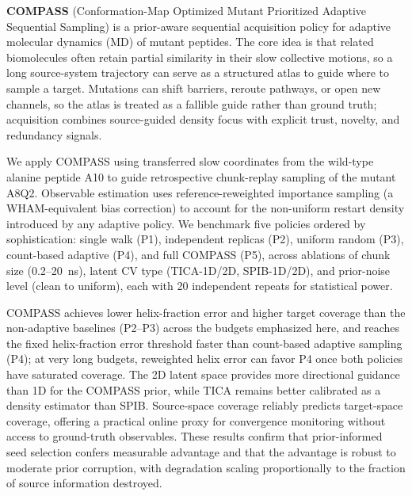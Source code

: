 \documentclass[12pt,a4paper,oneside]{report}
\begin{document}
\noindent
\textbf{COMPASS} (Conformation-Map Optimized Mutant Prioritized Adaptive Sequential Sampling) is a prior-aware sequential acquisition policy for adaptive molecular dynamics (MD) of mutant peptides.
The core idea is that related biomolecules often retain partial similarity in their slow collective motions, so a long source-system trajectory can serve as a structured atlas to guide where to sample a target.
Mutations can shift barriers, reroute pathways, or open new channels, so the atlas is treated as a fallible guide rather than ground truth; acquisition combines source-guided density focus with explicit trust, novelty, and redundancy signals.

We apply COMPASS using transferred slow coordinates from the wild-type alanine peptide A10 to guide
retrospective chunk-replay sampling of the mutant A8Q2.
Observable estimation uses reference-reweighted importance sampling (a WHAM-equivalent bias correction) to account for the non-uniform restart density introduced by any adaptive policy.
We benchmark five policies ordered by sophistication: single walk (P1), independent replicas (P2), uniform random (P3), count-based adaptive (P4), and full COMPASS (P5), across ablations of chunk size (0.2--20~ns), latent CV type (TICA-1D/2D, SPIB-1D/2D), and prior-noise level (clean to uniform), each with 20 independent repeats for statistical power.

COMPASS achieves lower helix-fraction error and higher target coverage than the non-adaptive baselines (P2--P3) across the budgets emphasized here, and reaches the fixed helix-fraction error threshold faster than count-based adaptive sampling (P4); at very long budgets, reweighted helix error can favor P4 once both policies have saturated coverage.
The 2D latent space provides more directional guidance than 1D for the COMPASS prior, while TICA remains better calibrated as a density estimator than SPIB.
Source-space coverage reliably predicts target-space coverage, offering a practical online proxy for convergence monitoring without access to ground-truth observables.
These results confirm that prior-informed seed selection confers measurable advantage and that the advantage is robust to moderate prior corruption, with degradation scaling proportionally to the fraction of source information destroyed.

\cleardoublepage

\tableofcontents
\cleardoublepage

{}
\listoftables
\cleardoublepage
\end{document}
